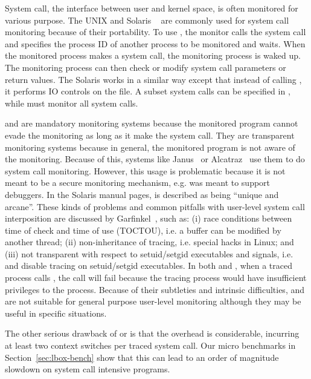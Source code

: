 System call, the interface between user and kernel space,
is often monitored for various purpose.
The UNIX  and Solaris ~\cite{faulkner1991process}
are commonly
used for system call monitoring because of their portability.
To use , the monitor calls the  system call
and specifies the process ID of another process to be monitored and waits.
When the monitored process makes a system call, the monitoring
process is waked up.
The monitoring process can then check or modify
system call parameters or return values.
The Solaris  works in a similar way except that
instead of calling , it performs IO controls on the
 file.
A subset system calls can be specified in ,
while  must monitor all system calls.

 and  are mandatory monitoring
systems because the monitored program cannot evade the monitoring as long
as it make the system call.
They are transparent monitoring systems because in general,
the monitored program is not aware of the monitoring.
Because of this,
systems like Janus~\cite{wagner1999janus} or
Alcatraz~\cite{liang2009alcatraz} use them to do system call monitoring.
However, this usage is problematic because it is not
meant to be a secure monitoring mechanism, e.g.
 was meant to support debuggers.
In the Solaris manual pages,  is described as being
``unique and arcane''.
These kinds of problems and common
pitfalls with user-level system call interposition
are discussed by Garfinkel~\cite{garfinkel2003traps}, such as:
(i) race conditions between time of check and time of use (TOCTOU), 
i.e. a buffer can be modified by another thread;
(ii) non-inheritance of tracing, i.e. special  hacks in Linux;
and (iii) not transparent with respect to setuid/setgid executables 
and signals,
i.e.  and  disable tracing 
on setuid/setgid executables.  
In both  and , when a traced process calls
,
the call will fail because the tracing process would have insufficient
privileges to the  process.
Because of their subtleties and intrinsic difficulties,
 and  are not suitable for general purpose user-level
monitoring although they may be useful in specific situations.

The other serious drawback of  or  is that
the overhead is considerable, incurring at least two
context switches per traced system call.
Our micro benchmarks in Section~\ref{sec:lbox-bench} show that
this can lead to an order of magnitude
slowdown on system call intensive programs.

